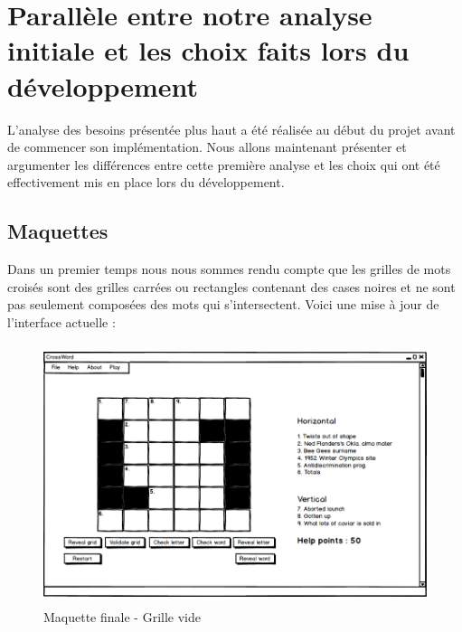 \documentclass [ 11 pt ] {article}
\begin{document}
\pagebreak
\newpage


\section{Parallèle entre notre analyse initiale et les choix faits lors du développement}

    L'analyse des besoins présentée plus haut a été réalisée au début du projet avant de commencer son implémentation. Nous allons maintenant présenter et argumenter les différences entre cette première analyse et les choix qui ont été effectivement mis en place lors du développement.\\

    \subsection{Maquettes}
        Dans un premier temps nous nous sommes rendu compte que les grilles de mots croisés sont des grilles carrées ou rectangles contenant des cases noires et ne sont pas seulement composées des mots qui s'intersectent.  Voici une mise à jour de l'interface actuelle :
    
        \begin{figure}[H]
        \begin{center}
        \includegraphics[height=3in]{Maquettes/finales/Grille_vide.png}
        \caption{Maquette finale - Grille vide} 
        \end{center}
        \end{figure}
        
\end{document}
